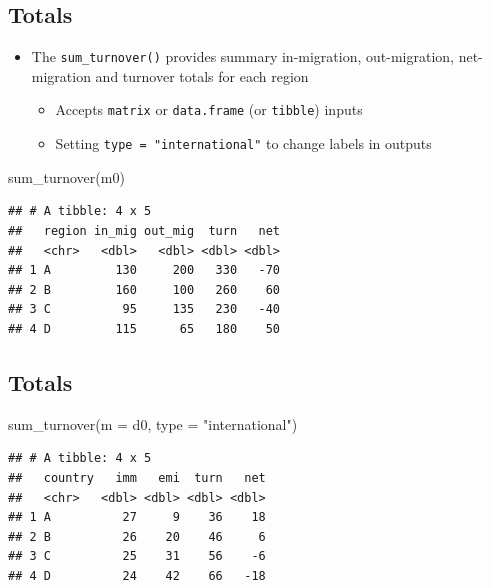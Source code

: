 \documentclass[
]{book}
\newenvironment{Shaded}{\begin{snugshade}}{\end{snugshade}}
\newcommand{\AttributeTok}[1]{\textcolor[rgb]{0.77,0.63,0.00}{#1}}
\newcommand{\FunctionTok}[1]{\textcolor[rgb]{0.00,0.00,0.00}{#1}}
\newcommand{\NormalTok}[1]{#1}
\newcommand{\StringTok}[1]{\textcolor[rgb]{0.31,0.60,0.02}{#1}}
\providecommand{\tightlist}{%
  \setlength{\itemsep}{0pt}\setlength{\parskip}{0pt}}
\begin{document}
\hypertarget{totals}{%
\subsection{Totals}\label{totals}}

\begin{itemize}
\tightlist
\item
  The \texttt{sum\_turnover()} provides summary in-migration, out-migration, net-migration and turnover totals for each region

  \begin{itemize}
  \tightlist
  \item
    Accepts \texttt{matrix} or \texttt{data.frame} (or \texttt{tibble}) inputs
  \item
    Setting \texttt{type\ =\ "international"} to change labels in outputs
  \end{itemize}
\end{itemize}

\begin{Shaded}
\begin{Highlighting}[]
\FunctionTok{sum\_turnover}\NormalTok{(m0)}
\end{Highlighting}
\end{Shaded}

\begin{verbatim}
## # A tibble: 4 x 5
##   region in_mig out_mig  turn   net
##   <chr>   <dbl>   <dbl> <dbl> <dbl>
## 1 A         130     200   330   -70
## 2 B         160     100   260    60
## 3 C          95     135   230   -40
## 4 D         115      65   180    50
\end{verbatim}

\hypertarget{totals-1}{%
\subsection{Totals}\label{totals-1}}

\begin{Shaded}
\begin{Highlighting}[]
\FunctionTok{sum\_turnover}\NormalTok{(}\AttributeTok{m =}\NormalTok{ d0, }\AttributeTok{type =} \StringTok{"international"}\NormalTok{)}
\end{Highlighting}
\end{Shaded}

\begin{verbatim}
## # A tibble: 4 x 5
##   country   imm   emi  turn   net
##   <chr>   <dbl> <dbl> <dbl> <dbl>
## 1 A          27     9    36    18
## 2 B          26    20    46     6
## 3 C          25    31    56    -6
## 4 D          24    42    66   -18
\end{verbatim}
\end{document}
